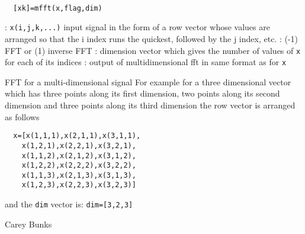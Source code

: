 
\begin{mandesc}
   \\ %
\end{mandesc}
\begin{calling_sequence}
\begin{verbatim}
  [xk]=mfft(x,flag,dim)  
\end{verbatim}
\end{calling_sequence}
\begin{parameters}
  \begin{varlist}
    : \verb!x(i,j,k,...)! input signal in the form of a row vector whose values are arranged so that the i index runs the quickest, followed by the j index, etc.
    : (-1) FFT or (1) inverse FFT
    : dimension vector which gives the number of values of \verb!x! for each of its indices
    : output of multidimensional fft in same format as for \verb!x!
  \end{varlist}
\end{parameters}
\begin{mandescription}
  FFT for a multi-dimensional signal
  For example for a three dimensional vector which has three points
  along its first dimension, two points along its second
  dimension and three points along its third dimension the row
  vector is arranged as follows
\begin{verbatim}
  x=[x(1,1,1),x(2,1,1),x(3,1,1),
    x(1,2,1),x(2,2,1),x(3,2,1),
    x(1,1,2),x(2,1,2),x(3,1,2),
    x(1,2,2),x(2,2,2),x(3,2,2),
    x(1,1,3),x(2,1,3),x(3,1,3),
    x(1,2,3),x(2,2,3),x(3,2,3)]
\end{verbatim}
and the \verb!dim! vector is: \verb!dim=[3,2,3]!
\end{mandescription}
\begin{authors}
  Carey Bunks
\end{authors}

